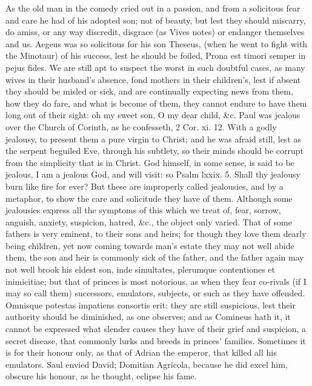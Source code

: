 {As the old man in the comedy cried out in a passion, and from a
solicitous fear and care he had of his adopted son; not of
beauty, but lest they should miscarry, do amiss, or any way discredit,
disgrace (as Vives notes) or endanger themselves and us. Aegeus
was so solicitous for his son Theseus, (when he went to fight with the
Minotaur) of his success, lest he should be foiled, Prona est
timori semper in pejus fides. We are still apt to suspect the worst in
such doubtful cases, as many wives in their husband's absence, fond
mothers in their children's, lest if absent they should be misled or
sick, and are continually expecting news from them, how they do fare,
and what is become of them, they cannot endure to have them long out of
their sight: oh my sweet son, O my dear child, \&c. Paul was jealous
over the Church of Corinth, as he confesseth, 2 Cor. xi. 12. With a
godly jealousy, to present them a pure virgin to Christ; and he was
afraid still, lest as the serpent beguiled Eve, through his subtlety,
so their minds should be corrupt from the simplicity that is in Christ.
God himself, in some sense, is said to be jealous, I am a jealous
God, and will visit: so Psalm lxxix. 5. Shall thy jealousy burn like
fire for ever? But these are improperly called jealousies, and by a
metaphor, to show the care and solicitude they have of them. Although
some jealousies express all the symptoms of this which we treat of,
fear, sorrow, anguish, anxiety, suspicion, hatred, \&c., the object only
varied. That of some fathers is very eminent, to their sons and heirs;
for though they love them dearly being children, yet now coming towards
man's estate they may not well abide them, the son and heir is commonly
sick of the father, and the father again may not well brook his eldest
son, inde simultates, plerumque contentiones et inimicitiae; but that
of princes is most notorious, as when they fear co-rivals (if I may so
call them) successors, emulators, subjects, or such as they have
offended.  Omnisque potestas impatiens consortis erit: they are
still suspicious, lest their authority should be diminished, as
one observes; and as Comineus hath it, it cannot be expressed
what slender causes they have of their grief and suspicion, a secret
disease, that commonly lurks and breeds in princes' families. Sometimes
it is for their honour only, as that of Adrian the emperor, that
killed all his emulators. Saul envied David; Domitian Agricola, because
he did excel him, obscure his honour, as he thought, eclipse his fame.
}
